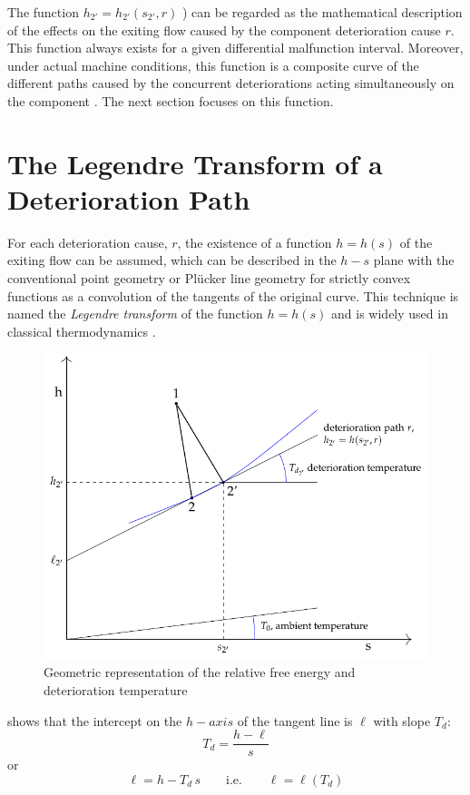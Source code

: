 \documentclass[energies,article,submit,moreauthors,pdftex]{Definitions/mdpi}
\begin{document}
The function $h_{2'}=h_{2'} (s_{2'}, r)$ ) can be regarded as the mathematical description of the effects on the exiting flow caused by the component deterioration cause $r$. This function always exists for a given differential malfunction interval. Moreover, under actual machine conditions, this function is a composite curve of the different paths caused by the concurrent deteriorations acting simultaneously on the component \cite{Valero2004c}. The next section focuses on this function.

\section{The Legendre Transform of a Deterioration Path}
For each deterioration cause, $r$, the existence of a function $h = h(s)$ of the exiting flow can be assumed, which can be described in the $h-s$ plane with the conventional point geometry or Plücker line geometry for strictly convex functions as a convolution of the tangents of the original curve. This technique is named the \emph{Legendre transform} of the function $h = h(s)$ and is widely used in classical thermodynamics \cite{Callen1985,Alberty2001}.

\begin{figure}[ht]
	\centering
	\includegraphics[scale=0.78]{rfe.pdf}
	\caption{Geometric representation of the relative free energy and deterioration temperature}
	\label{fig:rfe}
\end{figure}

 shows that the intercept on the $h-axis$ of the tangent line is $\ell$ with slope $T_d$:
\[
T_d=\frac{h-\ell}{s}
\]
or
\begin{equation}
\ell=h-T_d\,s \qquad \text{i.e.} \qquad \ell=\ell(T_d)
\label{eq:lgdr}
\end{equation}
\end{document}
